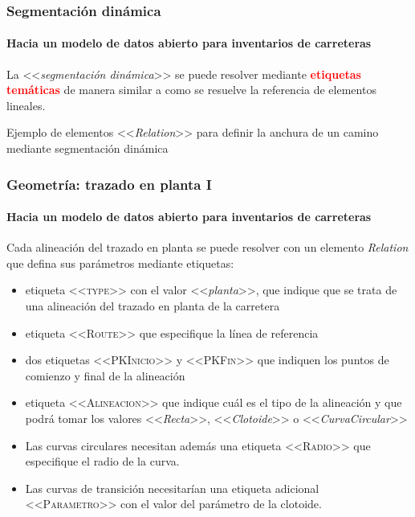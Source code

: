 \documentclass[aspectratio = 169, 12pt]{beamer}
\begin{document}
\begin{frame}
	\frametitle{Segmentación dinámica}
	\framesubtitle{Hacia un modelo de datos abierto para inventarios de carreteras}
	La <<\textit{segmentación dinámica}>> se puede resolver mediante \textcolor{red}{\textbf{etiquetas temáticas}} de manera similar a como se resuelve la referencia de elementos lineales.

	\begin{center}
		\vspace{1em}

	\tiny{Ejemplo de elementos <<\textit{Relation}>> para definir la anchura de un camino mediante segmentación dinámica}
	\end{center}
\end{frame}

\begin{frame}
	\frametitle{Geometría: trazado en planta I}
	\framesubtitle{Hacia un modelo de datos abierto para inventarios de carreteras}

	Cada alineación del trazado en planta se puede resolver con un elemento \textit{Relation} que defina sus parámetros mediante etiquetas:
	\begin{itemize}
		\item etiqueta <<\textsc{type}>> con el valor <<\textit{planta}>>, que indique que se trata de una alineación del trazado en planta de la carretera
		\item etiqueta <<\textsc{Route}>> que especifique la línea de referencia
		\item dos etiquetas <<\textsc{PKInicio}>> y <<\textsc{PKFin}>> que indiquen los puntos de comienzo y final de la alineación
		\item etiqueta <<\textsc{Alineacion}>> que indique cuál es el tipo de la alineación y que podrá tomar los valores <<\textit{Recta}>>, <<\textit{Clotoide}>> o <<\textit{CurvaCircular}>>
		\item Las curvas circulares necesitan además una etiqueta <<\textsc{Radio}>> que especifique el radio de la curva.
		\item 	Las curvas de transición necesitarían una etiqueta adicional <<\textsc{Parametro}>> con el valor del parámetro de la clotoide.
\end{itemize}
\end{frame}
\end{document}
